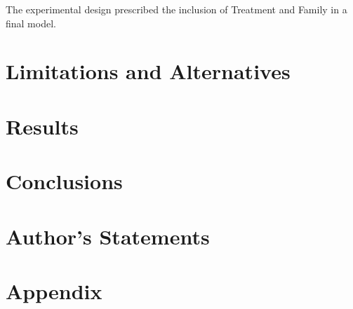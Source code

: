 \documentclass[12pt]{article}
\begin{document}
The experimental design prescribed the inclusion of Treatment and Family
in a final model.

\section{Limitations and Alternatives}
\label{sec:limits}

\section{Results}
\label{sec:results}

\section{Conclusions}
\label{sec:conc}

\section{Author's Statements}
\label{sec:auth}

\section{Appendix}
\label{sec:appendix}

\citet{Campbell02} \citeauthor{Schubert13}
\citetext{\citeyear{Schubert13}; \citealp{Chi81}}



\end{document}
